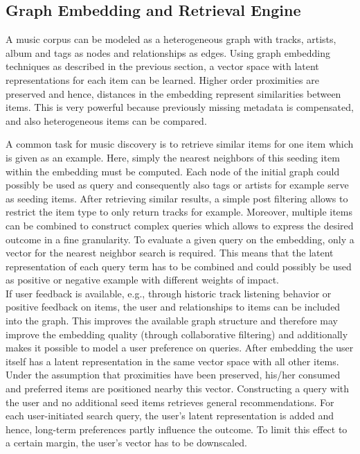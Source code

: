\documentclass[sigconf]{acmart}
\begin{document}
\subsection{Graph Embedding and Retrieval Engine}

A music corpus can be modeled as a heterogeneous graph with tracks, artists, album and tags as nodes and relationships as edges. Using graph embedding techniques as described in the previous section, a vector space with latent representations for each item can be learned. Higher order proximities are preserved and hence, distances in the embedding represent similarities between items. This is very powerful because previously missing metadata is compensated, and also heterogeneous items can be compared. 

A common task for music discovery is to retrieve similar items for one item which is given as an example. Here, simply the nearest neighbors of this seeding item within the embedding must be computed. Each node of the initial graph could possibly be used as query and consequently also tags or artists for example serve as seeding items. After retrieving similar results, a simple post filtering allows to restrict the item type to only return tracks for example. Moreover, multiple items can be combined to construct complex queries which allows to express the desired outcome in a fine granularity. To evaluate a given query on the embedding, only a vector for the nearest neighbor search is required. This means that the latent representation of each query term has to be combined and could possibly be used as positive or negative example with different weights of impact. \\


If user feedback is available, e.g., through historic track listening behavior or positive feedback on items, the user and relationships to items can be included into the graph. This improves the available graph structure and therefore may improve the embedding quality (through collaborative filtering) and additionally makes it possible to model a user preference on queries. After embedding the user itself has a latent representation in the same vector space with all other items. Under the assumption that proximities have been preserved, his/her consumed and preferred items are positioned nearby this vector. Constructing a query with the user and no additional seed items retrieves general recommendations. For each user-initiated search query, the user's latent representation is added and hence, long-term preferences partly influence the outcome. To limit this effect to a certain margin, the user's vector has to be downscaled. \\
\end{document}
